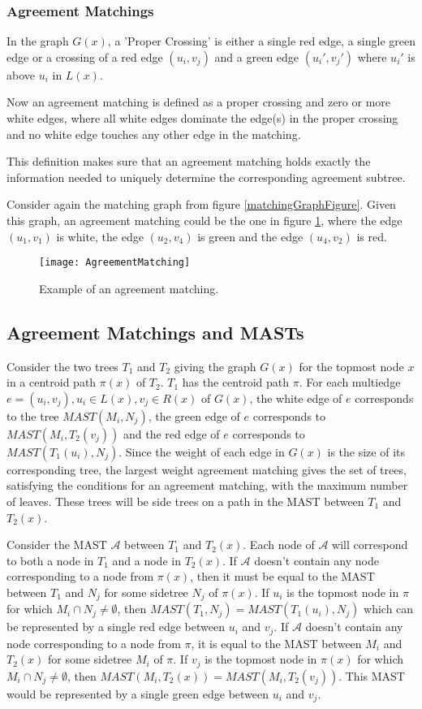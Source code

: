 \subsubsection{Agreement Matchings}
In the graph $G(x)$, a 'Proper Crossing' is either a single red edge, a single green edge or a crossing of a red edge $(u_i,v_j)$ and a green edge $(u_i',v_j')$ where $u_i'$ is above $u_i$ in $L(x)$.

Now an agreement matching is defined as a proper crossing and zero or more white edges, where all white edges dominate the edge(s) in the proper crossing and no white edge touches any other edge in the matching.

This definition makes sure that an agreement matching holds exactly the information needed to uniquely determine the corresponding agreement subtree.

Consider again the matching graph from figure \ref{matchingGraphFigure}. Given this graph, an agreement matching could be the one in figure \ref{agreementMatchingFigure}, where the edge $(u_1,v_1)$ is white, the edge $(u_2,v_4)$ is green and the edge $(u_4,v_2)$ is red.

\begin{figure}
	\texttt{[image: AgreementMatching]}
	\caption{Example of an agreement matching.}
	\label{agreementMatchingFigure}
\end{figure}

\subsection{Agreement Matchings and MASTs}
Consider the two trees $T_1$ and $T_2$ giving the graph $G(x)$ for the topmost node $x$ in a centroid path $\pi(x)$ of $T_2$. $T_1$ has the centroid path $\pi$. For each multiedge $e = (u_i, v_j), u_i \in L(x), v_j \in R(x)$ of $G(x)$, the white edge of $e$ corresponds to the tree $MAST(M_i, N_j)$, the green edge of $e$ corresponds to $MAST(M_i, T_2(v_j))$ and the red edge of $e$ corresponds to $MAST(T_1(u_i), N_j)$. Since the weight of each edge in $G(x)$ is the size of its corresponding tree, the largest weight agreement matching gives the set of trees, satisfying the conditions for an agreement matching, with the maximum number of leaves. These trees will be side trees on a path in the MAST between $T_1$ and $T_2(x)$.

Consider the MAST $\mathcal{A}$ between $T_1$ and $T_2(x)$. Each node of $\mathcal{A}$ will correspond to both a node in $T_1$ and a node in $T_2(x)$. If $\mathcal{A}$ doesn't contain any node corresponding to a node from $\pi(x)$, then it must be equal to the MAST between $T_1$ and $N_j$ for some sidetree $N_j$ of $\pi(x)$. If $u_i$ is the topmost node in $\pi$ for which $M_i \cap N_j \ne \emptyset$, then $MAST(T_1, N_j) = MAST(T_1(u_i), N_j)$ which can be represented by a single red edge between $u_i$ and $v_j$. If $\mathcal{A}$ doesn't contain any node corresponding to a node from $\pi$, it is equal to the MAST between $M_i$ and $T_2(x)$ for some sidetree $M_i$ of $\pi$. If $v_j$ is the topmost node in $\pi(x)$ for which $M_i \cap N_j \ne \emptyset$, then $MAST(M_i, T_2(x)) = MAST(M_i, T_2(v_j))$. This MAST would be represented by a single green edge between $u_i$ and $v_j$.

